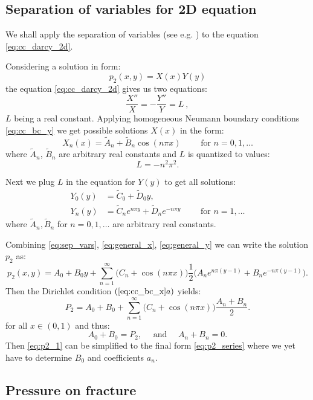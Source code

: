 \documentclass[a4paper,10pt]{article}
\begin{document}
\subsection{\bf Separation of variables for 2D equation}
\label{sec:p2_conductive}

We shall apply the separation of variables  (see e.g. \cite{Evans1998}) to the equation \eqref{eq:cc_darcy_2d}.  


Considering a solution in form:
\begin{equation}
    \label{eq:sep_vars}
    p_2(x,y) = X(x)Y(y) 
\end{equation}
the equation \eqref{eq:cc_darcy_2d} gives us two equations:
\[
\frac{X''}{X} = -\frac{Y''}{Y} = L\ ,
\]
$L$ being a real constant. Applying homogeneous Neumann boundary conditions \eqref{eq:cc_bc_y}
we get possible solutions $X(x)$ in the form: 
\begin{equation}
    \label{eq:general_x}
    X_n(x) = \tilde A_n + \tilde B_n \cos (n\pi x)\qquad \text{ for }n=0,1, \dots
\end{equation}
where $\tilde A_n$, $\tilde B_n$ are arbitrary real constants and $L$ is quantized to values:
\[
    L= - n^2 \pi^2.
\]


Next we plug $L$ in the equation for $Y(y)$ to get all solutions:
\begin{align}
Y_0(y) &= \tilde C_0 + \tilde D_0 y, \nonumber \\
\label{eq:general_y}
Y_n(y) &= \tilde C_n e^{n\pi y}+ \tilde D_n e^{-n\pi y}\qquad \text{ for } n =1, \dots
\end{align}
where $\tilde A_n, \tilde B_n$ for $n=0,1,\dots$ are arbitrary real constants.

Combining \eqref{eq:sep_vars}, \eqref{eq:general_x}, \eqref{eq:general_y} we can write the solution $p_2$ as:
\begin{equation}
    \label{eq:p2_1}
    p_2(x, y) = A_0 + B_0 y + \sum ^{\infty}_{n=1} \big(C_n + \cos (n\pi x)\big) 
            \frac{1}{2}\big(A_n e^{n\pi (y-1)} + B_n e^{-n\pi (y-1)}\big).
\end{equation}
Then the Dirichlet condition $(\ref{eq:cc_bc_x}a)$ yields:
\[
    P_2 = A_0 + B_0 + \sum ^{\infty}_{n=1} \big(C_n + \cos (n\pi x)\big) 
            \frac{A_n  + B_n}{2}.
\]
for all $x\in (0, 1)$ and thus:
\[
    A_0 + B_0 = P_2, \quad\text{ and } \quad A_n+B_n = 0.
\]
Then \eqref{eq:p2_1} can be simplified to the final form \eqref{eq:p2_series} where we yet have to determine $B_0$ and coefficients $a_n$.


\subsection{Pressure on fracture}
\label{sec:p1_conductive}
\end{document}
